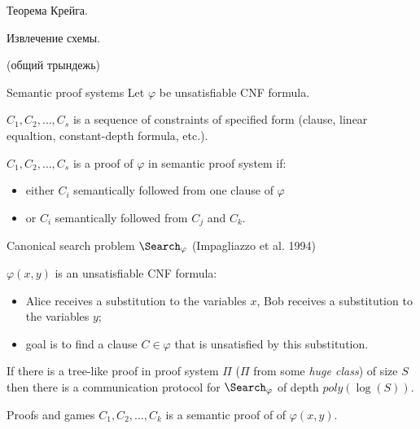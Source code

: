 \begin{frame}
    Теорема Крейга.

    Извлечение схемы.

    (общий трындежь)
\end{frame}


\begin{frame}{Semantic proof systems}
    Let $\varphi$ be unsatisfiable CNF formula.

    $C_1, C_2, \dots, C_s$ is a sequence of constraints of specified form (clause, linear equaltion, constant-depth formula,
    etc.).

    $C_1, C_2, \dots, C_s$ is a proof of $\varphi$ in semantic proof system if:
    \begin{itemize}
        \item either $C_i$ semantically followed from one clause of $\varphi$
        \item or $C_i$ semantically followed from $C_j$ and $C_k$.
    \end{itemize}

\end{frame}





\begin{frame}{Canonical search problem $\Search_{\varphi}$ (Impagliazzo et al. 1994)}

	
    $\varphi(x, y)$ is an unsatisfiable CNF formula:
    \begin{itemize}
        \item Alice receives a substitution to the variables $x$, Bob receives a substitution to the
            variables $y$;
        \item goal is to find a clause $C \in \varphi$ that is unsatisfied by this substitution.
    \end{itemize}

    \pause

    \begin{theorem}
        If there is a {\color{blue} tree-like} proof in proof system $\Pi$ ($\Pi$ from some \textit{huge
          class}) of size $S$ then there is a communication protocol for $\Search_{\varphi}$ of depth
        $poly(\log(S))$.
    \end{theorem}
    
\end{frame}


\begin{frame}{Proofs and games}
	$C_1, C_2, \dots, C_k$ is a semantic proof of of $\varphi(x, y)$.

    \begin{center}
    	    
    \end{center}

\end{frame}